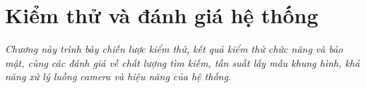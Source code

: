 \chapter{Kiểm thử và đánh giá hệ thống}
\label{chapter:kiemthu}

\textit{Chương này trình bày chiến lược kiểm thử, kết quả kiểm thử chức năng và bảo mật, cùng các đánh giá về chất lượng tìm kiếm, tần suất lấy mẫu khung hình, khả năng xử lý luồng camera và hiệu năng của hệ thống.}








